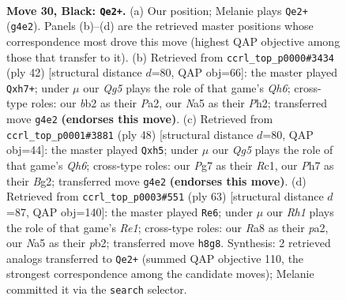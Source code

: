 \documentclass[11pt]{article}
\begin{document}
\clearpage

\begin{figure}[p]\centering
\begin{subfigure}{0.46\textwidth}\centering
\resizebox{\linewidth}{!}{%
\newchessgame
\chessboard[
  setfen={r3k2r/p3b1pp/8/n2p4/p2P2qP/4P1P1/1BQN2K1/2R5 b - - 3 30},
  showmover=false,
  pgfstyle=straightmove, color=movearrow, markmove={g4-e2}
]}
\caption{}
\end{subfigure}\hfill
\begin{subfigure}{0.46\textwidth}\centering
\resizebox{\linewidth}{!}{%
\newchessgame
\chessboard[
  setfen={2b3r1/1pn2k1p/p2p1p1Q/2q5/4P3/8/P1P2PPP/1R1R2K1 w - - 4 22},
  showmover=false,
  pgfstyle=straightmove, color=movearrow, markmove={h6-h7}
]}
\caption{}
\end{subfigure}
\\[4pt]
\begin{subfigure}{0.46\textwidth}\centering
\resizebox{\linewidth}{!}{%
\newchessgame
\chessboard[
  setfen={3r2k1/1p2p2p/2n2p1Q/7p/q7/P4NP1/2b1PPB1/2R3K1 w - - 2 25},
  showmover=false,
  pgfstyle=straightmove, color=movearrow, markmove={h6-h5}
]}
\caption{}
\end{subfigure}\hfill
\begin{subfigure}{0.46\textwidth}\centering
\resizebox{\linewidth}{!}{%
\newchessgame
\chessboard[
  setfen={4r1k1/1p3p1p/p1b5/7p/8/2NQ1PqP/PP4P1/3R1K2 b - - 9 32},
  showmover=false,
  pgfstyle=straightmove, color=movearrow, markmove={e8-e6}
]}
\caption{}
\end{subfigure}
\caption{\textbf{Move 30, Black: \texttt{Qe2+}.} (a) Our position; Melanie plays \texttt{Qe2+} (\texttt{g4e2}). Panels (b)--(d) are the retrieved master positions whose correspondence most drove this move (highest QAP objective among those that transfer to it). (b) Retrieved from \texttt{ccrl\_top\_p0000\#3434} (ply 42) [structural distance $d$=80, QAP obj=66]: the master played \texttt{Qxh7+}; under $\mu$ our \emph{Qg5} plays the role of that game's \emph{Qh6}; cross-type roles: our \emph{b}b2 as their \emph{P}a2, our \emph{N}a5 as their \emph{P}h2; transferred move \texttt{g4e2} \textbf{(endorses this move)}. (c) Retrieved from \texttt{ccrl\_top\_p0001\#3881} (ply 48) [structural distance $d$=80, QAP obj=44]: the master played \texttt{Qxh5}; under $\mu$ our \emph{Qg5} plays the role of that game's \emph{Qh6}; cross-type roles: our \emph{P}g7 as their \emph{R}c1, our \emph{P}h7 as their \emph{B}g2; transferred move \texttt{g4e2} \textbf{(endorses this move)}. (d) Retrieved from \texttt{ccrl\_top\_p0003\#551} (ply 63) [structural distance $d$=87, QAP obj=140]: the master played \texttt{Re6}; under $\mu$ our \emph{Rh1} plays the role of that game's \emph{Re1}; cross-type roles: our \emph{R}a8 as their \emph{p}a2, our \emph{N}a5 as their \emph{p}b2; transferred move \texttt{h8g8}. Synthesis: 2 retrieved analogs transferred to \texttt{Qe2+} (summed QAP objective 110, the strongest correspondence among the candidate moves); Melanie committed it via the \texttt{search} selector.}
\label{fig:thought-m59}
\end{figure}
\end{document}
